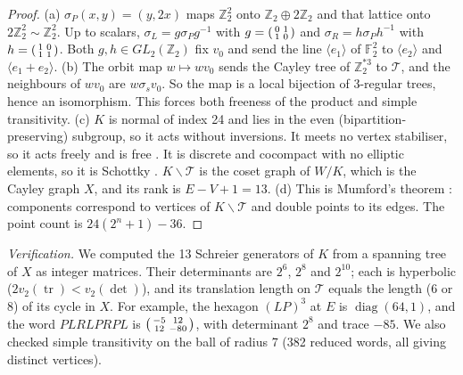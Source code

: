 \documentclass[11pt]{amsart}
\numberwithin{equation}{section}
\theoremstyle{plain}
\theoremstyle{definition}\newtheorem{definition}[theorem]{Definition}
\theoremstyle{remark}\newtheorem{remark}[theorem]{Remark}
\newcommand{\Z}{\mathbb{Z}}\newcommand{\Q}{\mathbb{Q}}\newcommand{\C}{\mathbb{C}}\newcommand{\F}{\mathbb{F}}\newcommand{\R}{\mathbb{R}}
\begin{document}
\begin{proof}
(a) $\sigma_P(x,y)=(y,2x)$ maps $\Z_2^2$ onto $\Z_2\oplus2\Z_2$ and that lattice onto $2\Z_2^2\sim\Z_2^2$. Up to scalars, $\sigma_L=g\sigma_Pg^{-1}$ with $g=\begin{psmallmatrix}0&1\\1&0\end{psmallmatrix}$ and $\sigma_R=h\sigma_Ph^{-1}$ with $h=\begin{psmallmatrix}1&0\\1&1\end{psmallmatrix}$. Both $g,h\in GL_2(\Z_2)$ fix $v_0$ and send the line $\langle e_1\rangle$ of $\F_2^2$ to $\langle e_2\rangle$ and $\langle e_1+e_2\rangle$.
(b) The orbit map $w\mapsto wv_0$ sends the Cayley tree of $\Z_2^{*3}$ to $\mathcal T$, and the neighbours of $wv_0$ are $w\sigma_sv_0$. So the map is a local bijection of 3-regular trees, hence an isomorphism. This forces both freeness of the product and simple transitivity.
(c) $K$ is normal of index 24 and lies in the even (bipartition-preserving) subgroup, so it acts without inversions. It meets no vertex stabiliser, so it acts freely and is free \cite{serre80}. It is discrete and cocompact with no elliptic elements, so it is Schottky \cite{ihara66,gvdp80}. $K\backslash\mathcal T$ is the coset graph of $W/K$, which is the Cayley graph $X$, and its rank is $E-V+1=13$.
(d) This is Mumford's theorem \cite{mumford72}: components correspond to vertices of $K\backslash\mathcal T$ and double points to its edges. The point count is $24(2^n+1)-36$.
\end{proof}
\noindent\emph{Verification.} We computed the 13 Schreier generators of $K$ from a spanning tree of $X$ as integer matrices. Their determinants are $2^6$, $2^8$ and $2^{10}$; each is hyperbolic ($2v_2(\operatorname{tr})<v_2(\det)$), and its translation length on $\mathcal T$ equals the length (6 or 8) of its cycle in $X$. For example, the hexagon $(LP)^3$ at $E$ is $\operatorname{diag}(64,1)$, and the word $PLRLPRPL$ is $\begin{psmallmatrix}-5&12\\12&-80\end{psmallmatrix}$, with determinant $2^8$ and trace $-85$. We also checked simple transitivity on the ball of radius 7 (382 reduced words, all giving distinct vertices).
\end{document}
